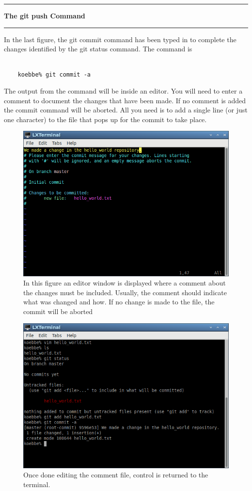 \documentclass[10pt,fleqn]{article}
\begin{document}
\eject
\vskip0.1in\hrule\vskip0.1in\noindent
{\bf The git push Command} 
\vskip0.1in\hrule\vskip0.1in\noindent
In the last figure, the git commit command has been typed in to complete the
changes identified by the git status command. The command is
\begin{verbatim}

    koebbe% git commit -a

\end{verbatim}
The output from the command will be inside an editor. You will need to enter a
comment to document the changes that have been made. If no comment is added the
commit command will be aborted. All you need is to add a single line (or just
one character) to the file that pops up for the commit to take place.
\vfill
\begin{figure}[h]
\centering
\includegraphics[width=5.0in]{../images/git_08.png}
\caption{In this figure an editor window is displayed where a comment about the
changes must be included. Usually, the comment should indicate what was changed
and how. If no change is made to the file, the commit will be aborted}
\end{figure}
\vfill
\begin{figure}[h]
\centering
\includegraphics[width=5.0in]{../images/git_09.png}
\caption{Once done editing the comment file, control is returned to the
terminal.}
\end{figure}
\end{document}
